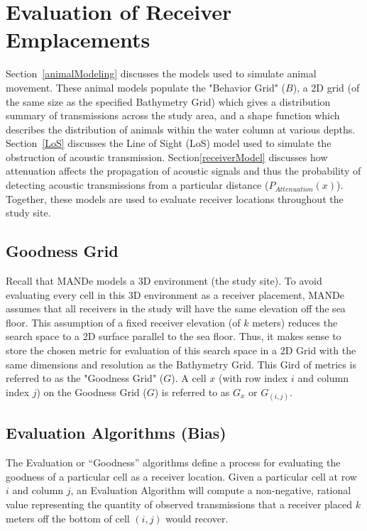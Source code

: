 \section{Evaluation of Receiver Emplacements}
\label{evaluationOfReceierEmplacements}
Section~\ref{animalModeling} discusses the models used to simulate animal movement.  These animal models populate the "Behavior Grid" ($B$), a 2D grid (of the same size as the specified Bathymetry Grid) which gives a distribution summary of transmissions across the study area, and a shape function which describes the distribution of animals within the water column at various depths.  Section~\ref{LoS} discusses the Line of Sight (LoS) model used to simulate the obstruction of acoustic transmission.  Section\ref{receiverModel} discusses how attenuation affects the propagation of acoustic signals and thus the probability of detecting acoustic transmissions from a particular distance ($P_{Attenuation}(x)$).  Together, these models are used to evaluate receiver locations throughout the study site.  

\subsection{Goodness Grid}
\label{GoodnessGrid}
Recall that MANDe models a 3D environment (the study site).  To avoid evaluating every cell in this 3D environment as a receiver placement, MANDe assumes that all receivers in the study will have the same elevation off the sea floor.  This assumption of a fixed receiver elevation (of $k$ meters) reduces the search space to a 2D surface parallel to the sea floor.  Thus, it makes sense to store the chosen metric for evaluation of this search space in a 2D Grid with the same dimensions and resolution as the Bathymetry Grid.  This Gird of metrics is referred to as the "Goodness Grid" ($G$).  A cell $x$ (with row index $i$ and column index $j$) on the Goodness Grid ($G$) is referred to as $G_x$ or $G_{(i,j)}$. 


\subsection{Evaluation Algorithms (Bias)}
\label{evalAlgorithms}
The Evaluation or “Goodness” algorithms define a process for evaluating the goodness of a particular cell as a receiver location.  Given a particular cell at row $i$ and column $j$, an Evaluation Algorithm will compute a non-negative, rational value representing the quantity of observed transmissions that a receiver placed $k$ meters off the bottom of cell $(i,j)$ would recover.

